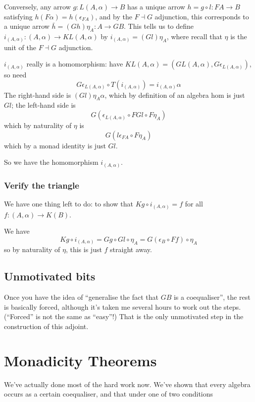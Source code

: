 \documentclass[11pt]{amsart}
\begin{document}
Conversely, any arrow $g: L(A, \alpha) \to B$ has a unique arrow $h = g \circ l: FA \to B$ satisfying $h(F \alpha) = h (\epsilon_{FA})$, and by the $F \dashv G$ adjunction, this corresponds to a unique arrow $\bar{h} = (Gh) \eta_A : A \to GB$.
This tells us to define $i_{(A, \alpha)} : (A, \alpha) \to KL(A, \alpha)$ by $i_{(A, \alpha)} = (Gl) \eta_A$, where recall that $\eta$ is the unit of the $F \dashv G$ adjunction.

$i_{(A, \alpha)}$ really is a homomorphism: have $KL(A, \alpha) = (GL(A, \alpha), G \epsilon_{L(A, \alpha)})$, so need $$G \epsilon_{L(A, \alpha)} \circ T(i_{(A, \alpha)}) = i_{(A, \alpha)} \alpha$$
The right-hand side is $(Gl) \eta_A \alpha$, which by definition of an algebra hom is just $Gl$; the left-hand side is $$G(\epsilon_{L(A, \alpha)} \circ FGl \circ F\eta_A)$$
which by naturality of $\eta$ is $$G(l \epsilon_{FA} \circ F \eta_A)$$
which by a monad identity is just $Gl$.

So we have the homomorphism $i_{(A, \alpha)}$.

\subsubsection{Verify the triangle}

We have one thing left to do: to show that $Kg \circ i_{(A, \alpha)} = f$ for all $f: (A, \alpha) \to K(B)$.

We have $$Kg \circ i_{(A, \alpha)} = Gg \circ Gl \circ \eta_A = G(\epsilon_B \circ Ff) \circ \eta_A$$
so by naturality of $\eta$, this is just $f$ straight away.

\subsection{Unmotivated bits}

Once you have the idea of ``generalise the fact that $GB$ is a coequaliser'', the rest is basically forced, although it's taken me several hours to work out the steps.
(``Forced'' is not the same as ``easy''!)
That is the only unmotivated step in the construction of this adjoint.

\section{Monadicity Theorems}

We've actually done most of the hard work now.
We've shown that every algebra occurs as a certain coequaliser, and that under one of two conditions
\end{document}
